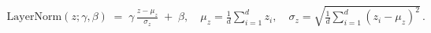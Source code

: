 \documentclass[preview]{standalone}
\begin{document}
\begin{align*}
\mathrm{LayerNorm}(z;\gamma,\beta) \;=\; \gamma \,\frac{z - \mu_z}{\sigma_z} \;+\; \beta,\quad\mu_z = \frac{1}{d}\sum_{i=1}^{d} z_i,\quad\sigma_z = \sqrt{\frac{1}{d}\sum_{i=1}^{d} (z_i - \mu_z)^2}\,.
\end{align*}
\end{document}
